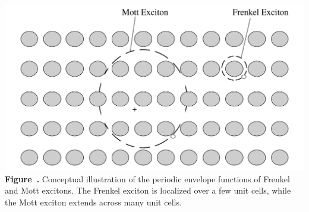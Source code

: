 \begin{center}
	\begin{minipage}{0.75\textwidth}
		\centering
		\includegraphics[width=\textwidth]{img/exciton.png}
		\\[0.5em]
		\textbf{Figure~\thefigure.} Conceptual illustration of the periodic envelope functions of Frenkel and Mott excitons. The Frenkel exciton is localized over a few unit cells, while the Mott exciton extends across many unit cells.
		\label{fig:exciton}
	\end{minipage}
\end{center}

